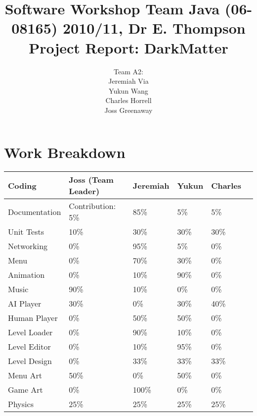 \documentclass[11pt, a4paper]{report}
\title{{\normalsize Software Workshop Team Java (06-08165) 2010/11, Dr E. Thompson }\\[2cm]
  Project Report: DarkMatter\\}
\author{Team A2:  \\
  Jeremiah Via \\
  Yukun Wang \\
  Charles Horrell \\
  Joss Greenaway
}
\begin{document}
\maketitle
\chapter*{Work Breakdown}
\label{work-breakdown}

\thispagestyle{empty}

{\small
  \noindent\begin{tabular}{|l||l|l|l|l|l|}\hline
    \textbf{Coding} & \textbf{Joss (Team Leader)} & \textbf{Jeremiah} & \textbf{Yukun} & \textbf{Charles} \\ \hline\hline
    Documentation   & Contribution: 5\%           & 85\%              & 5\%            & 5\%              \\ \hline
    Unit Tests      & 10\%                        & 30\%              & 30\%           & 30\%             \\ \hline
    Networking      & 0\%                         & 95\%              & 5\%            & 0\%              \\ \hline
    Menu            & 0\%                         & 70\%              & 30\%           & 0\%              \\ \hline
    Animation       & 0\%                         & 10\%              & 90\%           & 0\%              \\ \hline
    Music           & 90\%                        & 10\%              & 0\%            & 0\%              \\ \hline
    AI Player       & 30\%                        & 0\%               & 30\%           & 40\%             \\ \hline
    Human Player    & 0\%                         & 50\%              & 50\%           & 0\%              \\ \hline
    Level Loader    & 0\%                         & 90\%              & 10\%           & 0\%              \\ \hline
    Level Editor    & 0\%                         & 10\%              & 95\%           & 0\%              \\ \hline
    Level Design    & 0\%                         & 33\%              & 33\%           & 33\%             \\ \hline
    Menu Art        & 50\%                        & 0\%               & 50\%           & 0\%              \\ \hline
    Game Art        & 0\%                         & 100\%             & 0\%            & 0\%              \\ \hline
    Physics         & 25\%                        & 25\%              & 25\%           & 25\%             \\ \hline
  \end{tabular}

}
\end{document}
